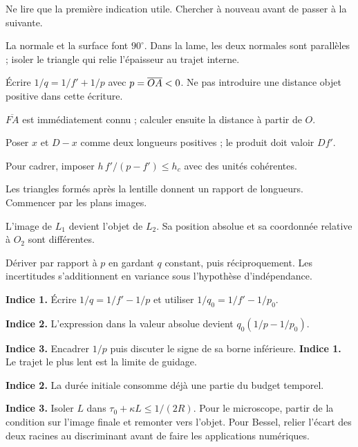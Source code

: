 Ne lire que la première indication utile. Chercher à nouveau avant de passer à la suivante.
\begin{description}[style=nextline,leftmargin=0pt,font=\sffamily\bfseries\small]
\item[E04--E06] La normale et la surface font $90^\circ$. Dans la lame, les deux normales sont parallèles ; isoler le triangle qui relie l'épaisseur au trajet interne.
\item[E10--E12] Écrire $1/q=1/f'+1/p$ avec $p=\overline{OA}<0$. Ne pas introduire une distance objet positive dans cette écriture.
\item[E14] $\overline{FA}$ est immédiatement connu ; calculer ensuite la distance à partir de $O$.
\item[E15] Poser $x$ et $D-x$ comme deux longueurs positives ; le produit doit valoir $Df'$.
\item[E18] Pour cadrer, imposer $h\,f'/(p-f')\leq h_c$ avec des unités cohérentes.
\item[E20] Les triangles formés après la lentille donnent un rapport de longueurs. Commencer par les plans images.
\item[E23] L'image de $L_1$ devient l'objet de $L_2$. Sa position absolue et sa coordonnée relative à $O_2$ sont différentes.
\item[E24] Dériver par rapport à $p$ en gardant $q$ constant, puis réciproquement. Les incertitudes s'additionnent en variance sous l'hypothèse d'indépendance.
\end{description}
\textbf{Indice 1.} Écrire $1/q=1/f'-1/p$ et utiliser $1/q_0=1/f'-1/p_0$.\par
\textbf{Indice 2.} L'expression dans la valeur absolue devient $q_0(1/p-1/p_0)$.\par
\textbf{Indice 3.} Encadrer $1/p$ puis discuter le signe de sa borne inférieure.
\textbf{Indice 1.} Le trajet le plus lent est la limite de guidage.\par
\textbf{Indice 2.} La durée initiale consomme déjà une partie du budget temporel.\par
\textbf{Indice 3.} Isoler $L$ dans $\tau_0+\kappa L\leq1/(2R)$.
Pour le microscope, partir de la condition sur l'image finale et remonter vers l'objet. Pour Bessel, relier l'écart des deux racines au discriminant avant de faire les applications numériques.

